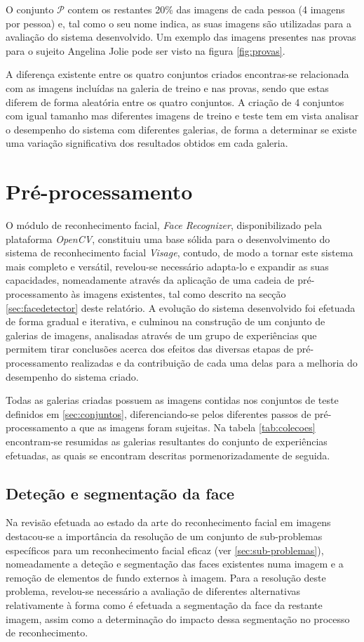O conjunto $\mathscr{P}$ contem os restantes 20\% das imagens de cada pessoa (4 imagens por pessoa) e, tal como o seu nome indica, as suas imagens são utilizadas para a avaliação do sistema desenvolvido. Um exemplo das imagens presentes nas provas para o sujeito Angelina Jolie pode ser visto na figura \ref{fig:provas}.

A diferença existente entre os quatro conjuntos criados encontras-se relacionada com as imagens incluídas na galeria de treino e nas provas, sendo que estas diferem de forma aleatória entre os quatro conjuntos. A criação de 4 conjuntos com igual tamanho mas diferentes imagens de treino e teste tem em vista analisar o desempenho do sistema com diferentes galerias, de forma a determinar se existe uma variação significativa dos resultados obtidos em cada galeria.

\section{Pré-processamento} \label{sec:experiencias}
O módulo de reconhecimento facial, \textit{Face Recognizer}, disponibilizado pela plataforma \textit{OpenCV}, constituiu uma base sólida para o desenvolvimento do sistema de reconhecimento facial \textit{Visage}, contudo, de modo a tornar este sistema mais completo e versátil, revelou-se necessário adapta-lo e expandir as suas capacidades, nomeadamente através da aplicação de uma cadeia de pré-processamento às imagens existentes, tal como descrito na secção \ref{sec:facedetector} deste relatório. A evolução do sistema desenvolvido foi efetuada de forma gradual e iterativa, e culminou na construção de um conjunto de galerias de imagens, analisadas através de um grupo de experiências que permitem tirar conclusões acerca dos efeitos das diversas etapas de pré-processamento realizadas e da contribuição de cada uma delas para a melhoria do desempenho do sistema criado. 

Todas as galerias criadas possuem as imagens contidas nos conjuntos de teste definidos em \ref{sec:conjuntos}, diferenciando-se pelos diferentes passos de pré-processamento a que as imagens foram sujeitas. Na tabela \ref{tab:colecoes} encontram-se resumidas as galerias resultantes do conjunto de experiências efetuadas, as quais se encontram descritas pormenorizadamente de seguida.

\subsection{Deteção e segmentação da face} \label{sec:pre-detecao}
Na revisão efetuada ao estado da arte do reconhecimento facial em imagens destacou-se a importância da resolução de um conjunto de sub-problemas específicos para um reconhecimento facial eficaz (ver \ref{sec:sub-problemas}), nomeadamente a deteção e segmentação das faces existentes numa imagem e  a remoção de elementos de fundo externos à imagem. Para a resolução deste problema, revelou-se necessário a avaliação de diferentes alternativas relativamente à forma como é efetuada a segmentação da face da restante imagem, assim como a determinação do impacto dessa segmentação no processo de reconhecimento.

